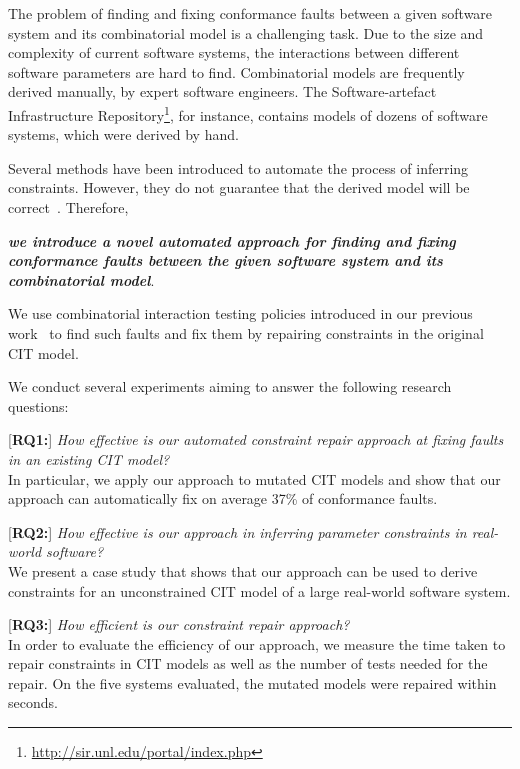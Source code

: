 \begin{tikzborder}{\cite{Gargantini16:validation}}
The problem of finding and fixing conformance faults between a given software system and its combinatorial model is a challenging task. Due to the size and complexity of current software systems, the interactions between different software parameters are hard to find. Combinatorial models are frequently derived manually, by expert software engineers. The Software-artefact Infrastructure Repository\footnote{\url{http://sir.unl.edu/portal/index.php}}, for instance, contains models of dozens of software systems, which were derived by hand. 

Several methods have been introduced to automate the process of inferring constraints. However, they do not guarantee that the derived model will be correct~\cite{Temple16:using}. Therefore,

\vspace{0.2em}
\noindent \textit{\textbf{we introduce a novel automated approach for finding and fixing conformance faults between the given software system and its combinatorial model}}. 
\vspace{0.2em}

We use combinatorial interaction testing policies introduced in our previous work~\cite{Gargantini16:validation} to find such faults and fix them by repairing constraints in the original CIT model.

We conduct several experiments aiming to answer the following research questions:

\vspace{0.2em}
[\textbf{RQ1:}] \emph{How effective is our automated constraint repair approach at fixing faults in an existing CIT model?}\\
In particular, we apply our approach to mutated CIT models and show that our approach can automatically fix on average 37\% of conformance faults.

\vspace{0.2em}
[\textbf{RQ2:}] \emph{How effective is our approach in inferring parameter constraints in real-world software?}\\
We present a case study that shows that our approach can be used to derive constraints for an unconstrained CIT model of a large real-world software system.

\vspace{0.2em}
[\textbf{RQ3:}] \emph{How efficient is our constraint repair approach?}\\
In order to evaluate the efficiency of our approach, we measure the time taken to repair constraints in CIT models as well as the number of tests needed for the repair. On the five systems evaluated, the mutated models were repaired within seconds.
\vspace{0.2em}


\end{tikzborder}

